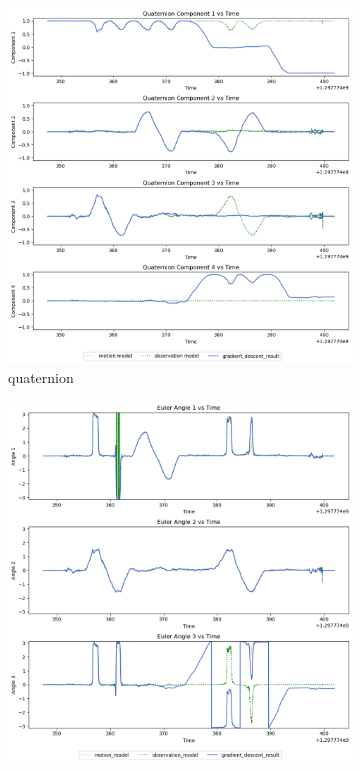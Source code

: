 \documentclass[conference]{IEEEtran}
\begin{document}
\begin{figure}[h]
    \centering
    \begin{subfigure}{0.4\textwidth}
        \includegraphics[width=\linewidth]{../img/11_qt.png}
        \caption{quaternion}
    \end{subfigure}
    \hfill
    \begin{subfigure}{0.4\textwidth}
        \includegraphics[width=\linewidth]{../img/11_ea.png}

\end{subfigure}
\end{figure}
\end{document}
